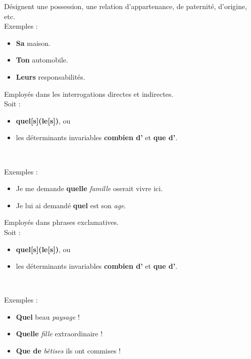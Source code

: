 \documentclass[10pt, french]{article}
\begin{document}
\begin{multicols*}{2}
\begin{definitionNOHFILLsub}
Désignent une possession, une relation d'appartenance, de paternité, d'origine, etc.\\

Exemples :
\begin{itemize}
	\item	\textbf{Sa} maison.
	\item	\textbf{Ton} automobile.
	\item	\textbf{Leurs} responsabilités.
\end{itemize}
\end{definitionNOHFILLsub}

\begin{definitionNOHFILLsub}
Employés dans les interrogations directes et indirectes.\\

Soit :
\begin{itemize}
	\item	\textbf{quel[s](le[s])}, ou
	\item	les déterminants invariables \textbf{combien d'} et \textbf{que d'}.
\end{itemize}

\

Exemples :
\begin{itemize}
	\item	Je me demande \textbf{quelle} \textit{famille} oserait vivre ici.
	\item	Je lui ai demandé \textbf{quel} est son \textit{age}.
\end{itemize}
\end{definitionNOHFILLsub}

\begin{definitionNOHFILLsub}
Employés dans phrases exclamatives.	\\

Soit :
\begin{itemize}
	\item	\textbf{quel[s](le[s])}, ou
	\item	les déterminants invariables \textbf{combien d'} et \textbf{que d'}.
\end{itemize}

\

Exemples :
\begin{itemize}
	\item	\textbf{Quel} beau \textit{paysage} ! 
	\item	\textbf{Quelle} \textit{fille} extraordinaire ! 
	\item	\textbf{Que de} \textit{bêtises} ils ont commises ! 
\end{itemize}
\end{definitionNOHFILLsub}


\end{multicols*}
\end{document}
